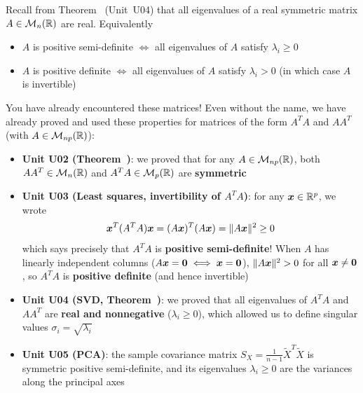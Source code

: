 \documentclass[aspectratio=169]{beamer}\usepackage[]{graphicx}\usepackage[]{xcolor}
\begin{document}
\begin{frame}
Recall from Theorem~ (Unit~U04) that all eigenvalues of a real symmetric matrix $A\in\mathcal{M}_n(\mathbb{R})$ are real. Equivalently
\vfill
\begin{itemize}
\item $A$ is positive semi-definite $\iff$ all eigenvalues of $A$ satisfy $\lambda_i \ge 0$
\vfill
\item $A$ is positive definite $\iff$ all eigenvalues of $A$ satisfy $\lambda_i > 0$ (in which case $A$ is invertible)
\end{itemize}
\end{frame}

\begin{frame}{You have already encountered these matrices!}
Even without the name, we have already proved and used these properties for matrices of the form $A^TA$ and $AA^T$ (with $A\in\mathcal{M}_{np}(\mathbb{R})$):
\vfill
\begin{itemize}
\item \textbf{Unit U02 (Theorem~)}: we proved that for any $A\in\mathcal{M}_{np}(\mathbb{R})$, both $AA^T\in\mathcal{M}_n(\mathbb{R})$ and $A^TA\in\mathcal{M}_p(\mathbb{R})$ are \textbf{symmetric}
\vfill
\item \textbf{Unit U03 (Least squares, invertibility of $A^TA$)}: for any $\bm{x}\in\mathbb{R}^p$, we wrote
\[
\bm{x}^T(A^TA)\bm{x} = (A\bm{x})^T(A\bm{x}) = \|A\bm{x}\|^2 \ge 0
\]
which says precisely that $A^TA$ is \textbf{positive semi-definite}! When $A$ has linearly independent columns ($A\bx=\b0 \iff \bx=\b0$), $\|A\bm{x}\|^2 > 0$ for all $\bx\neq\b0$, so $A^TA$ is \textbf{positive definite} (and hence invertible)
\end{itemize}
\end{frame}

\begin{frame}
\begin{itemize}
\item \textbf{Unit U04 (SVD, Theorem~)}: we proved that all eigenvalues of $A^TA$ and $AA^T$ are \textbf{real and nonnegative} ($\lambda_i \ge 0$), which allowed us to define singular values $\sigma_i = \sqrt{\lambda_i}$
\vfill
\item \textbf{Unit U05 (PCA)}: the sample covariance matrix $S_X = \frac{1}{n-1}\widetilde{X}^T\widetilde{X}$ is symmetric positive semi-definite, and its eigenvalues $\lambda_i \ge 0$ are the variances along the principal axes
\end{itemize}
\end{frame}
\end{document}
